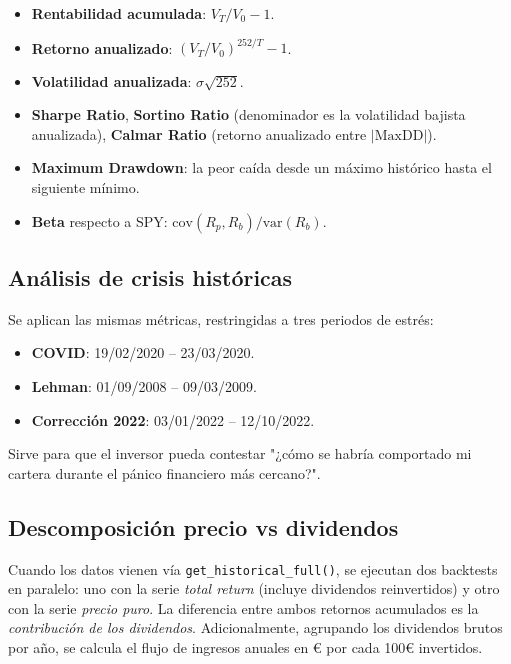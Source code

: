 \documentclass[11pt,a4paper]{article}
\begin{document}
\begin{itemize}
  \item \textbf{Rentabilidad acumulada}: $V_T/V_0 - 1$.
  \item \textbf{Retorno anualizado}: $(V_T/V_0)^{252/T} - 1$.
  \item \textbf{Volatilidad anualizada}: $\sigma\sqrt{252}$.
  \item \textbf{Sharpe Ratio}, \textbf{Sortino Ratio} (denominador es la volatilidad bajista anualizada), \textbf{Calmar Ratio} (retorno anualizado entre $|\mathrm{MaxDD}|$).
  \item \textbf{Maximum Drawdown}: la peor caída desde un máximo histórico hasta el siguiente mínimo.
  \item \textbf{Beta} respecto a SPY: $\mathrm{cov}(R_p, R_b)/\mathrm{var}(R_b)$.
\end{itemize}

\subsection{Análisis de crisis históricas}

Se aplican las mismas métricas, restringidas a tres periodos de estrés:

\begin{itemize}
  \item \textbf{COVID}: 19/02/2020 -- 23/03/2020.
  \item \textbf{Lehman}: 01/09/2008 -- 09/03/2009.
  \item \textbf{Corrección 2022}: 03/01/2022 -- 12/10/2022.
\end{itemize}

Sirve para que el inversor pueda contestar "¿cómo se habría comportado mi cartera durante el pánico financiero más cercano?".

\subsection{Descomposición precio vs dividendos}

Cuando los datos vienen vía \texttt{get\_historical\_full()}, se ejecutan dos backtests en paralelo: uno con la serie \textit{total return} (incluye dividendos reinvertidos) y otro con la serie \textit{precio puro}. La diferencia entre ambos retornos acumulados es la \textit{contribución de los dividendos}. Adicionalmente, agrupando los dividendos brutos por año, se calcula el flujo de ingresos anuales en € por cada 100€ invertidos.
\end{document}
